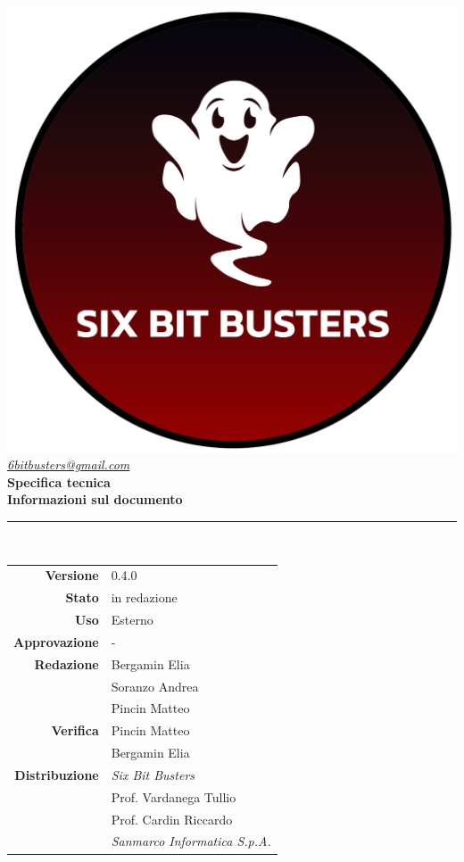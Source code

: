 \thispagestyle{empty}
\renewcommand{\arraystretch}{1.3}


\begin{titlepage}
	\begin{center}
		
	\includegraphics[scale = 0.6]{template/images/logo-circle.png}
	\\[0.8cm]
	\href{mailto:6bitbusters@gmail.com}		      	
	{\large{\textit{6bitbusters@gmail.com} } }\\[0.8cm]
	
	\Huge \textbf{Specifica tecnica} \\[0.5cm]

	\large \textbf{Informazioni sul documento} \\
	\rule{0.6\textwidth}{0.4pt}
	\\[0.5cm]
	\begin{tabular}{r|l}
		\textbf{Versione} & 0.4.0\\
		\textbf{Stato} & in redazione\\
		\textbf{Uso} & Esterno\\                         
		\textbf{Approvazione} & -\\                      
		\textbf{Redazione} & Bergamin Elia \\ & Soranzo Andrea \\ & Pincin Matteo \\
		\textbf{Verifica} & Pincin Matteo \\ & Bergamin Elia \\                    
		\textbf{Distribuzione} & \textit{Six Bit Busters} \\ & Prof. Vardanega Tullio \\ & Prof. Cardin Riccardo \\ & \textit{Sanmarco Informatica S.p.A.}
	\end{tabular}	
	\\[0.8cm]


\end{center}
\end{titlepage}

